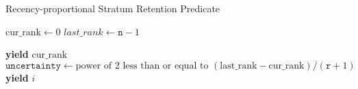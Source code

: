 \begin{algorithm}
\caption{Recency-proportional Stratum Retention Predicate}
\label{alg:recency-proportional-resolution-algo-pred-keep-rank}
\begin{algorithmic}[1]

    \STATE $\text{cur\_rank} \gets 0$
    \STATE $last\_rank \gets \texttt{n} - 1$

        \STATE \textbf{yield} $\text{cur\_rank}$
        \STATE $\texttt{uncertainty} \gets \text{power of 2 less than or equal to } (\text{last\_rank} - \text{cur\_rank}) / (\texttt{r} + 1)$
    \ENDWHILE
        \STATE \textbf{yield} $i$
    \ENDFOR
\end{algorithmic}
\end{algorithm}
